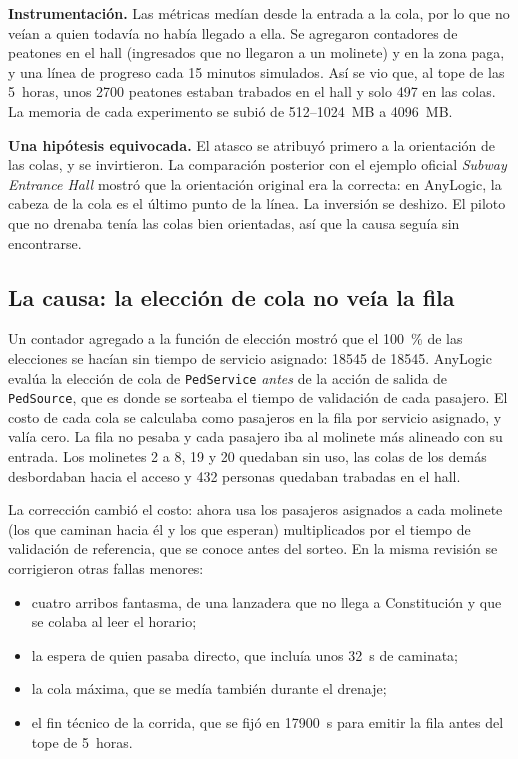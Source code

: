 \textbf{Instrumentación.} Las métricas medían desde la entrada a la cola, por lo que no veían a quien
todavía no había llegado a ella. Se agregaron contadores de peatones en el hall (ingresados que no
llegaron a un molinete) y en la zona paga, y una línea de progreso cada 15 minutos simulados. Así se vio
que, al tope de las 5~horas, unos \num{2700} peatones estaban trabados en el hall y solo 497 en las colas.
La memoria de cada experimento se subió de 512--\num{1024}~MB a \num{4096}~MB.

\textbf{Una hipótesis equivocada.} El atasco se atribuyó primero a la orientación de las colas, y se
invirtieron. La comparación posterior con el ejemplo oficial \emph{Subway Entrance Hall} mostró que la
orientación original era la correcta: en AnyLogic, la cabeza de la cola es el último punto de la línea.
La inversión se deshizo. El piloto que no drenaba tenía las colas bien orientadas, así que la causa
seguía sin encontrarse.

\subsection{La causa: la elección de cola no veía la fila}

Un contador agregado a la función de elección mostró que el 100~\% de las elecciones se hacían sin tiempo
de servicio asignado: \num{18545} de \num{18545}. AnyLogic evalúa la elección de cola de
\texttt{PedService} \emph{antes} de la acción de salida de \texttt{PedSource}, que es donde se sorteaba el
tiempo de validación de cada pasajero. El costo de cada cola se calculaba como pasajeros en la fila por
servicio asignado, y valía cero. La fila no pesaba y cada pasajero iba al molinete más alineado con su
entrada. Los molinetes 2 a 8, 19 y 20 quedaban sin uso, las colas de los demás desbordaban hacia el acceso
y 432 personas quedaban trabadas en el hall.

La corrección cambió el costo: ahora usa los pasajeros asignados a cada molinete (los que caminan hacia
él y los que esperan) multiplicados por el tiempo de validación de referencia, que se conoce antes del
sorteo. En la misma revisión se corrigieron otras fallas menores:
\begin{itemize}
  \item cuatro arribos fantasma, de una lanzadera que no llega a Constitución y que se colaba al leer el
        horario;
  \item la espera de quien pasaba directo, que incluía unos 32~s de caminata;
  \item la cola máxima, que se medía también durante el drenaje;
  \item el fin técnico de la corrida, que se fijó en \num{17900}~s para emitir la fila antes del tope de
        5~horas.
\end{itemize}

